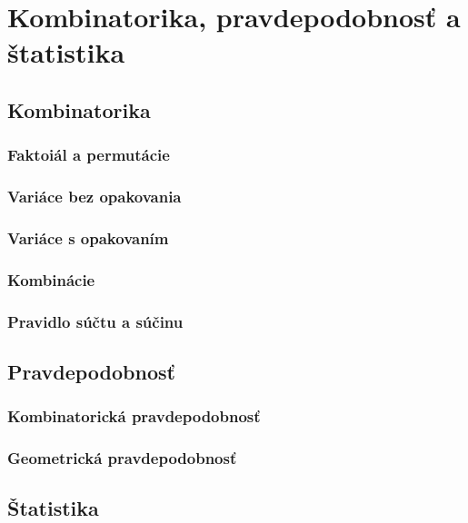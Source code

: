 \chapter{Kombinatorika, pravdepodobnosť a štatistika}
\label{chap:pas}

\section{Kombinatorika}

\subsection{Faktoiál a permutácie}

\subsection{Variáce bez opakovania}

\subsection{Variáce s opakovaním}

\subsection{Kombinácie}

\subsection{Pravidlo súčtu a súčinu}

\newpage

\section{Pravdepodobnosť}

\subsection{Kombinatorická pravdepodobnosť}

\subsection{Geometrická pravdepodobnosť}

\newpage

\section{Štatistika}